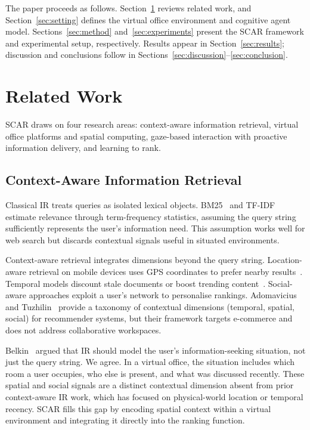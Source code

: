 \documentclass[journal]{IEEEtran}
\begin{document}
The paper proceeds as follows.
Section~\ref{sec:related} reviews related work, and
Section~\ref{sec:setting} defines the virtual office environment and
cognitive agent model.  Sections~\ref{sec:method}
and~\ref{sec:experiments} present the SCAR framework and experimental
setup, respectively.  Results appear in Section~\ref{sec:results};
discussion and conclusions follow in
Sections~\ref{sec:discussion}--\ref{sec:conclusion}.

\section{Related Work}
\label{sec:related}

SCAR draws on four research areas: context-aware information retrieval, virtual office platforms and spatial computing, gaze-based interaction with proactive information delivery, and learning to rank.

\subsection{Context-Aware Information Retrieval}

Classical IR treats queries as isolated lexical objects. BM25~\cite{robertson2009bm25} and TF-IDF~\cite{manning2008ir} estimate relevance through term-frequency statistics, assuming the query string sufficiently represents the user's information need. This assumption works well for web search but discards contextual signals useful in situated environments.

Context-aware retrieval integrates dimensions beyond the query string. Location-aware retrieval on mobile devices uses GPS coordinates to prefer nearby results~\cite{croft2010search}. Temporal models discount stale documents or boost trending content~\cite{lv2009positional}. Social-aware approaches exploit a user's network to personalise rankings. Adomavicius and Tuzhilin~\cite{car_survey} provide a taxonomy of contextual dimensions (temporal, spatial, social) for recommender systems, but their framework targets e-commerce and does not address collaborative workspaces.

Belkin~\cite{belkin2008some} argued that IR should model the user's information-seeking situation, not just the query string. We agree. In a virtual office, the situation includes which room a user occupies, who else is present, and what was discussed recently. These spatial and social signals are a distinct contextual dimension absent from prior context-aware IR work, which has focused on physical-world location or temporal recency. SCAR fills this gap by encoding spatial context within a virtual environment and integrating it directly into the ranking function.
\end{document}
